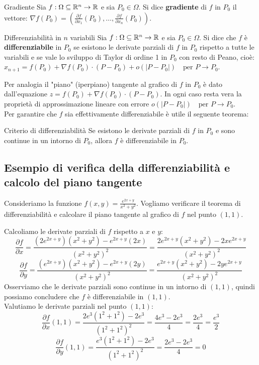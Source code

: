 \begin{definizione}{Gradiente}
Sia $f:\Omega \subseteq \mathbb{R}^n \rightarrow \mathbb{R}$ e sia $P_0 \in \Omega$. Si dice \textbf{gradiente} di $f$ in $P_0$ il vettore: $\nabla f(P_0)=\left(\frac{\partial f}{\partial x_1}(P_0), \dots, \frac{\partial f}{\partial x_n}(P_0)\right)$.
\end{definizione}

\begin{definizione}{Differenziabilità in $n$ variabili}
Sia $f:\Omega \subseteq \mathbb{R}^n \rightarrow \mathbb{R}$ e sia $P_0 \in \Omega$. Si dice che $f$ è \textbf{differenziabile} in $P_0$ se esistono le derivate parziali di $f$ in $P_0$ rispetto a tutte le variabili e se vale lo sviluppo di Taylor di ordine 1 in $P_0$ con resto di Peano, cioè: $x_{n+1}=f(P_0)+\nabla f(P_0)\cdot (P - P_0)+o(|P-P_0|) \quad \text{per } P \rightarrow P_0$.
\end{definizione}

Per analogia il "piano" (iperpiano) tangente al grafico di $f$ in $P_0$ è dato dall'equazione $z=f(P_0)+\nabla f(P_0)\cdot (P - P_0)$. In ogni caso resta vera la proprietà di approssimazione lineare con errore $o(|P-P_0|) \quad \text{per } P \rightarrow P_0$.\\

Per garantire che $f$ sia effettivamente differenziabile è utile il seguente teorema:
\begin{teorema}{Criterio di differenziabilità}
Se esistono le derivate parziali di $f$ in $P_0$ e sono continue in un intorno di $P_0$, allora $f$ è differenziabile in $P_0$.
\end{teorema}

\subsection{Esempio di verifica della differenziabilità e calcolo del piano tangente}
Consideriamo la funzione $f(x,y) = \frac{e^{2x+y}}{x^2+y^2}$. Vogliamo verificare il teorema di differenziabilità e calcolare il piano tangente al grafico di $f$ nel punto $(1,1)$.

Calcoliamo le derivate parziali di $f$ rispetto a $x$ e $y$:
\[
\frac{\partial f}{\partial x} = \frac{(2e^{2x+y})(x^2+y^2) - e^{2x+y}(2x)}{(x^2+y^2)^2} = \frac{2e^{2x+y}(x^2+y^2) - 2xe^{2x+y}}{(x^2+y^2)^2}
\]
\[
\frac{\partial f}{\partial y} = \frac{(e^{2x+y})(x^2+y^2) - e^{2x+y}(2y)}{(x^2+y^2)^2} = \frac{e^{2x+y}(x^2+y^2) - 2ye^{2x+y}}{(x^2+y^2)^2}
\]
Osserviamo che le derivate parziali sono continue in un intorno di $(1,1)$, quindi possiamo concludere che $f$ è differenziabile in $(1,1)$.\\
Valutiamo le derivate parziali nel punto $(1,1)$:
\[
\frac{\partial f}{\partial x}(1,1) = \frac{2e^{3}(1^2+1^2) - 2e^{3}}{(1^2+1^2)^2} = \frac{4e^{3} - 2e^{3}}{4} = \frac{2e^{3}}{4} = \frac{e^{3}}{2}
\]
\[
\frac{\partial f}{\partial y}(1,1) = \frac{e^{3}(1^2+1^2) - 2e^{3}}{(1^2+1^2)^2} = \frac{2e^{3} - 2e^{3}}{4} = 0
\]

